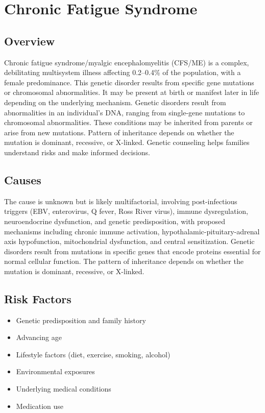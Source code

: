 \chapter{Chronic Fatigue Syndrome}
\label{sec:Chronic Fatigue Syndrome}

\section{Overview}
Chronic fatigue syndrome/myalgic encephalomyelitis (CFS/ME) is a complex, debilitating multisystem illness affecting 0.2--0.4\% of the population, with a female predominance. This genetic disorder results from specific gene mutations or chromosomal abnormalities. It may be present at birth or manifest later in life depending on the underlying mechanism. Genetic disorders result from abnormalities in an individual's DNA, ranging from single-gene mutations to chromosomal abnormalities. These conditions may be inherited from parents or arise from new mutations. Pattern of inheritance depends on whether the mutation is dominant, recessive, or X-linked. Genetic counseling helps families understand risks and make informed decisions.
\section{Causes}
The cause is unknown but is likely multifactorial, involving post-infectious triggers (EBV, enterovirus, Q fever, Ross River virus), immune dysregulation, neuroendocrine dysfunction, and genetic predisposition, with proposed mechanisms including chronic immune activation, hypothalamic-pituitary-adrenal axis hypofunction, mitochondrial dysfunction, and central sensitization. Genetic disorders result from mutations in specific genes that encode proteins essential for normal cellular function. The pattern of inheritance depends on whether the mutation is dominant, recessive, or X-linked.   
\section{Risk Factors}

\begin{itemize}[noitemsep]
  \item Genetic predisposition and family history
  \item Advancing age
  \item Lifestyle factors (diet, exercise, smoking, alcohol)
  \item Environmental exposures
  \item Underlying medical conditions
  \item Medication use
\end{itemize}
